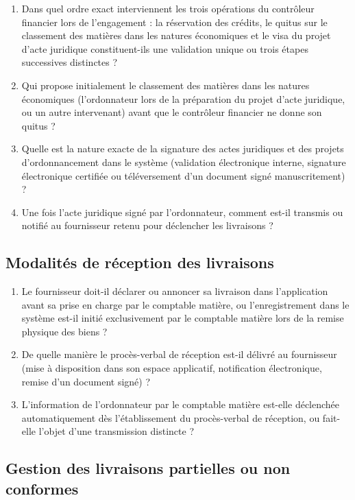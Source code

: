 \begin{enumerate}
  \item Dans quel ordre exact interviennent les trois opérations du contrôleur financier lors de l'engagement : la réservation des crédits, le quitus sur le classement des matières dans les natures économiques et le visa du projet d'acte juridique constituent-ils une validation unique ou trois étapes successives distinctes ?
  \item Qui propose initialement le classement des matières dans les natures économiques (l'ordonnateur lors de la préparation du projet d'acte juridique, ou un autre intervenant) avant que le contrôleur financier ne donne son quitus ?
  \item Quelle est la nature exacte de la signature des actes juridiques et des projets d'ordonnancement dans le système (validation électronique interne, signature électronique certifiée ou téléversement d'un document signé manuscritement) ?
  \item Une fois l'acte juridique signé par l'ordonnateur, comment est-il transmis ou notifié au fournisseur retenu pour déclencher les livraisons ?
\end{enumerate}

\subsection{Modalités de réception des livraisons}

\begin{enumerate}
  \item Le fournisseur doit-il déclarer ou annoncer sa livraison dans l'application avant sa prise en charge par le comptable matière, ou l'enregistrement dans le système est-il initié exclusivement par le comptable matière lors de la remise physique des biens ?
  \item De quelle manière le procès-verbal de réception est-il délivré au fournisseur (mise à disposition dans son espace applicatif, notification électronique, remise d'un document signé) ?
  \item L'information de l'ordonnateur par le comptable matière est-elle déclenchée automatiquement dès l'établissement du procès-verbal de réception, ou fait-elle l'objet d'une transmission distincte ?
\end{enumerate}

\subsection{Gestion des livraisons partielles ou non conformes}

